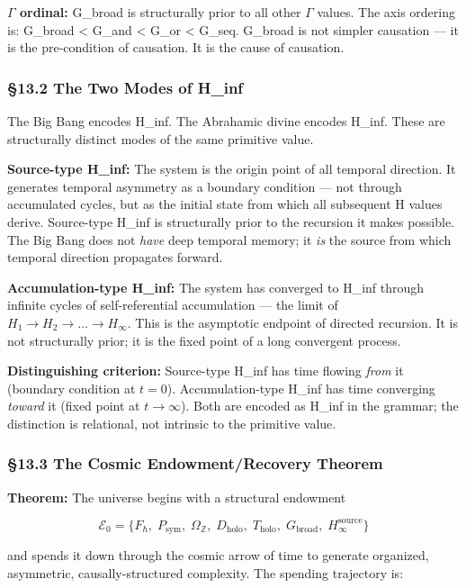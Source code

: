 \documentclass[12pt,a4paper]{article}
\newcommand{\pilcrow}{\S}
\begin{document}
\textbf{$\Gamma$ ordinal:} G\_broad is structurally prior to all other $\Gamma$ values. The axis ordering is: G\_broad \textless{} G\_and \textless{} G\_or \textless{} G\_seq. G\_broad is not simpler causation --- it is the pre-condition of causation. It is the cause of causation.

\subsubsection{\pilcrow{}13.2 The Two Modes of H\_inf}

The Big Bang encodes H\_inf. The Abrahamic divine encodes H\_inf. These are structurally distinct modes of the same primitive value.

\textbf{Source-type H\_inf:} The system is the origin point of all temporal direction. It generates temporal asymmetry as a boundary condition --- not through accumulated cycles, but as the initial state from which all subsequent H values derive. Source-type H\_inf is structurally prior to the recursion it makes possible. The Big Bang does not \emph{have} deep temporal memory; it \emph{is} the source from which temporal direction propagates forward.

\textbf{Accumulation-type H\_inf:} The system has converged to H\_inf through infinite cycles of self-referential accumulation --- the limit of $H_1 \to H_2 \to \dots \to H_{\infty}$. This is the asymptotic endpoint of directed recursion. It is not structurally prior; it is the fixed point of a long convergent process.

\textbf{Distinguishing criterion:} Source-type H\_inf has time flowing \emph{from} it (boundary condition at $t = 0$). Accumulation-type H\_inf has time converging \emph{toward} it (fixed point at $t \to \infty$). Both are encoded as H\_inf in the grammar; the distinction is relational, not intrinsic to the primitive value.

\subsubsection{\pilcrow{}13.3 The Cosmic Endowment/Recovery Theorem}

\textbf{Theorem:} The universe begins with a structural endowment

\[\mathcal{E}_0 = \{F_{\hbar},\; P_{\text{sym}},\; \Omega_{\mathbb{Z}},\; D_{\text{holo}},\; T_{\text{holo}},\; G_{\text{broad}},\; H_{\infty}^{\text{source}}\}\]

and spends it down through the cosmic arrow of time to generate organized, asymmetric, causally-structured complexity. The spending trajectory is:
\end{document}
